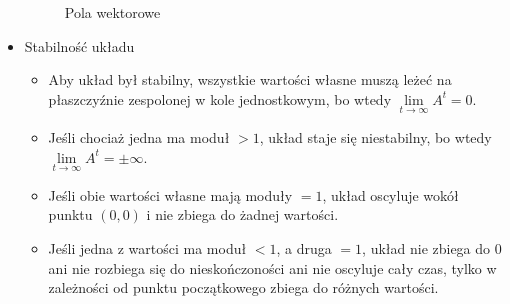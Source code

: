 \documentclass[a4paper, 12pt]{article}
\begin{document}
\begin{itemize}
\begin{figure}[h]
\begin{center}
				\caption{Pola wektorowe}
			\end{center}
		\end{figure}
		\item Stabilność układu
		\begin{itemize}
			\item Aby układ był stabilny, wszystkie wartości własne muszą leżeć na płaszczyźnie zespolonej w kole jednostkowym, bo wtedy $\lim\limits_{t\rightarrow \infty}A^t = 0$.
			\item Jeśli chociaż jedna ma moduł $>1$, układ staje się niestabilny, bo wtedy $\lim\limits_{t\rightarrow\infty}A^t = \pm\infty$.
			\item Jeśli obie wartości własne mają moduły $=1$, układ oscyluje wokół punktu $(0,0)$ i nie zbiega do żadnej wartości.
			\item Jeśli jedna z wartości ma moduł $<1$, a druga $=1$, układ nie zbiega do 0 ani nie rozbiega się do nieskończoności ani nie oscyluje cały czas, tylko w zależności od punktu początkowego zbiega do różnych wartości.
		\end{itemize}  
		\begin{figure}[h]
			\begin{center}
\end{center}
\end{figure}
\end{itemize}
\end{document}
